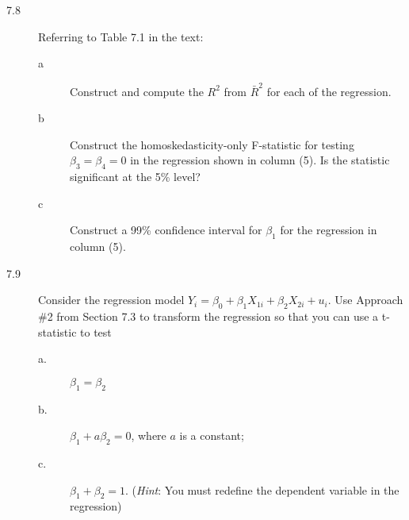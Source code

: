 \documentclass[a4paper,11pt]{article}
\begin{document}
\vspace{0.5cm}

\begin{description}
\item[{7.8}] Referring to Table 7.1 in the text:
\begin{description}
\item[{a}] Construct and compute the \(R^2\) from \(\bar{R}^2\) for each of
the regression.
\item[{b}] Construct the homoskedasticity-only F-statistic for testing
\(\beta_3 = \beta_4 = 0\) in the regression shown in column
(5). Is the statistic significant at the 5\% level?
\item[{c}] Construct a 99\% confidence interval for \(\beta_1\) for the
regression in column (5).
\end{description}
\end{description}

\vspace{0.5cm}

\begin{description}
\item[{7.9}] Consider the regression model \(Y_i = \beta_0 + \beta_1
         X_{1i} + \beta_2 X_{2i} + u_i\). Use Approach \#2 from Section
7.3 to transform the regression so that you can use a
t-statistic to test
\begin{description}
\item[{a.}] \(\beta_1 = \beta_2\)
\item[{b.}] \(\beta_1 + a\beta_2 = 0\), where \(a\) is a constant;
\item[{c.}] \(\beta_1 + \beta_2 = 1\). (\emph{Hint}: You must redefine the
dependent variable in the regression)
\end{description}
\end{description}

\vspace{0.5cm}
\end{document}
